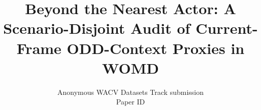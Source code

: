 \documentclass[10pt,twocolumn,letterpaper]{article}
\title{Beyond the Nearest Actor: A Scenario-Disjoint Audit of Current-Frame ODD-Context Proxies in WOMD}
\author{Anonymous WACV Datasets Track submission\\
Paper ID \wacvPaperID
}
\begin{document}
\maketitle










{
    \small
    
    
}
\end{document}
